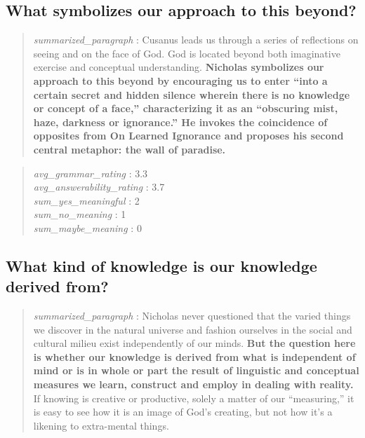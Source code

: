 \hypertarget{what-symbolizes-our-approach-to-this-beyond}{%
\subsection{What symbolizes our approach to this
beyond?}\label{what-symbolizes-our-approach-to-this-beyond}}

\begin{quote}
\emph{summarized\_paragraph} : Cusanus leads us through a series of
reflections on seeing and on the face of God. God is located beyond both
imaginative exercise and conceptual understanding. \textbf{Nicholas
symbolizes our approach to this beyond by encouraging us to enter ``into
a certain secret and hidden silence wherein there is no knowledge or
concept of a face,'' characterizing it as an ``obscuring mist, haze,
darkness or ignorance.'' He invokes the coincidence of opposites from On
Learned Ignorance and proposes his second central metaphor: the wall of
paradise.}
\end{quote}

\begin{quote}
\emph{avg\_grammar\_rating} : 3.3\\
\emph{avg\_answerability\_rating} : 3.7\\
\emph{sum\_yes\_meaningful} : 2\\
\emph{sum\_no\_meaning} : 1\\
\emph{sum\_maybe\_meaning} : 0
\end{quote}

\hypertarget{what-kind-of-knowledge-is-our-knowledge-derived-from}{%
\subsection{What kind of knowledge is our knowledge derived
from?}\label{what-kind-of-knowledge-is-our-knowledge-derived-from}}

\begin{quote}
\emph{summarized\_paragraph} : Nicholas never questioned that the varied
things we discover in the natural universe and fashion ourselves in the
social and cultural milieu exist independently of our minds. \textbf{But
the question here is whether our knowledge is derived from what is
independent of mind or is in whole or part the result of linguistic and
conceptual measures we learn, construct and employ in dealing with
reality.} If knowing is creative or productive, solely a matter of our
``measuring,'' it is easy to see how it is an image of God's creating,
but not how it's a likening to extra-mental things.
\end{quote}

